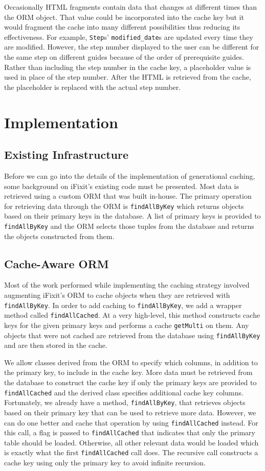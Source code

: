 \documentclass[12pt]{ucthesis}
\begin{document}
Occasionally HTML fragments contain data that changes at different times than the ORM object.
That value could be incorporated into the cache key but it would fragment the cache into many different possibilities thus reducing its effectiveness.
For example, {\tt Step}s' {\tt modified\_date}s are updated every time they are modified.
However, the step number displayed to the user can be different for the same step on different guides because of the order of prerequisite guides.
Rather than including the step number in the cache key, a placeholder value is used in place of the step number.
After the HTML is retrieved from the cache, the placeholder is replaced with the actual step number.


\section{Implementation} \label{implementation}
\subsection{Existing Infrastructure}
Before we can go into the details of the implementation of generational caching, some background on \textsf{iFixit}'s existing code must be presented.
Most data is retrieved using a custom ORM that was built in-house.
The primary operation for retrieving data through the ORM is {\tt findAllByKey} which returns objects based on their primary keys in the database.
A list of primary keys is provided to {\tt findAllByKey} and the ORM selects those tuples from the database and returns the objects constructed from them.

\subsection{Cache-Aware ORM}
Most of the work performed while implementing the caching strategy involved augmenting \textsf{iFixit}'s ORM to cache objects when they are retrieved with {\tt findAllByKey}.
In order to add caching to {\tt findAllByKey}, we add a wrapper method called {\tt findAllCached}.
At a very high-level, this method constructs cache keys for the given primary keys and performs a cache {\tt getMulti} on them.
Any objects that were not cached are retrieved from the database using {\tt findAllByKey} and are then stored in the cache.

We allow classes derived from the ORM to specify which columns, in addition to the primary key, to include in the cache key.
More data must be retrieved from the database to construct the cache key if only the primary keys are provided to {\tt findAllCached} and the derived class specifies additional cache key columns.
Fortunately, we already have a method, {\tt findAllByKey}, that retrieves objects based on their primary key that can be used to retrieve more data.
However, we can do one better and cache that operation by using {\tt findAllCached} instead.
For this call, a flag is passed to {\tt findAllCached} that indicates that only the primary table should be loaded.
Otherwise, all other relevant data would be loaded which is exactly what the first {\tt findAllCached} call does.
The recursive call constructs a cache key using only the primary key to avoid infinite recursion.
\end{document}
